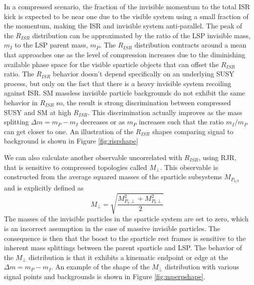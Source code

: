 In a compressed scenario, the fraction of the invisible momentum to the total ISR kick is expected to be near one due to the visible system using a small fraction of the momentum, making the ISR and invisible system anti-parallel. The peak of the $R_{ISR}$ distribution can be approximated by the ratio of the LSP invisible mass, $m_I$ to the LSP parent mass, $m_P$.  The $R_{ISR}$ distribution contracts around a mean that approaches one as the level of compression increases due to the diminishing available phase space for the visible sparticle objects that can offset the $R_{ISR}$ ratio. The $R_{ISR}$ behavior doesn't depend specifically on an underlying SUSY process, but only on the fact that there is a heavy invisible system recoiling against ISR.  SM massless invisible particle backgrounds do not exhibit the same behavior in $R_{ISR}$ so, the result is strong discrimination between compressed SUSY and SM at high $R_{ISR}$.  This discrimination actually improves as the mass splitting $\Delta m = m_P - m_I$ decreases or as $m_P$ increases such that the ratio $m_I/m_P$ can get closer to one. An illustration of the $R_{ISR}$ shapes comparing signal to background is shown in Figure \ref{fig:risrshape}


We can also calculate another observable uncorrelated with $R_{ISR}$, using RJR, that is sensitive to compressed topologies called $M_\perp$. This observable is constructed from the average squared masses of the sparticle subsystems $M_{P_{a/b}}$ and is explicitly defined as
\begin{equation}
M_\perp = \sqrt{\frac{M_{P_a\perp}^2 + M_{P_b\perp}^2}{2}}
\end{equation}
The masses of the invisible particles in the sparticle system are set to zero, which is an incorrect assumption in the case of massive invisible particles. The consequence is then that the boost to the sparticle rest frames is sensitive to the inherent mass splittings between the parent sparticle and LSP. The behavior of the $M_\perp$ distribution is that it exhibits a kinematic endpoint or edge at the $\Delta m = m_P - m_I$. An example of the shape of the $M_\perp$ distribution with various signal points and backgrounds is shown in Figure \ref{fig:mperpshape}.

